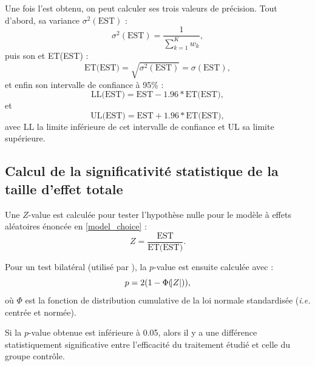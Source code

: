 Une fois l'\gls{est} obtenu, on peut calculer ses trois valeurs de précision. Tout d'abord, sa variance $\sigma^2(\text{EST})$ :  
\begin{equation}
\label{eq:metareview_variance_summary_effect}
\sigma^2(\text{EST}) = \frac{1} {\sum_{k=1}^{K} w_k},
\end{equation} 
puis son \gls{et} ET(EST) :
\begin{equation}
\label{eq:metareview_standard_error_effect}
\text{ET(EST)} = \sqrt{\sigma^2(\text{EST})} = \sigma(\text{EST}),
\end{equation} 
et enfin son intervalle de confiance à 95\% : 
\begin{equation}
\label{eq:metareview_confidence_interval_summary_effect_lower_bound}
\text{LL(EST)} = \text{EST} - 1.96 * \text{ET(EST)},
\end{equation}
et 
\begin{equation}
\label{eq:metareview_confidence_interval_summary_effect_upper_bound}
\text{UL(EST)} = \text{EST} + 1.96 * \text{ET(EST)},
\end{equation}
avec LL la limite inférieure de cet intervalle de confiance et UL sa limite supérieure.

\subsection{Calcul de la significativité statistique de la taille d'effet totale}

Une $Z$-value est calculée pour tester l'hypothèse nulle pour le modèle à effets aléatoires énoncée en \ref{model_choice} :
\begin{equation}
\label{eq:metareview_confidence_interval_summary_effect_z_value}
Z = \frac{\text{EST}} {\text{ET(EST)}}.
\end{equation}

Pour un test bilatéral (utilisé par \citet{Micoulaud2014, Cortese2016}), la $p$-value est ensuite calculée avec :
\begin{equation}
\label{eq:metareview_confidence_interval_summary_effect_p_value}
p = 2(1 - \Phi(\abs{Z})),
\end{equation} 
où $\Phi$ est la fonction de distribution cumulative de la loi normale standardisée (\textit{i.e.} centrée et normée).

Si la $p$-value obtenue est inférieure à 0.05, alors il y a une différence statistiquement significative entre l'efficacité du traitement étudié 
et celle du groupe contrôle.

